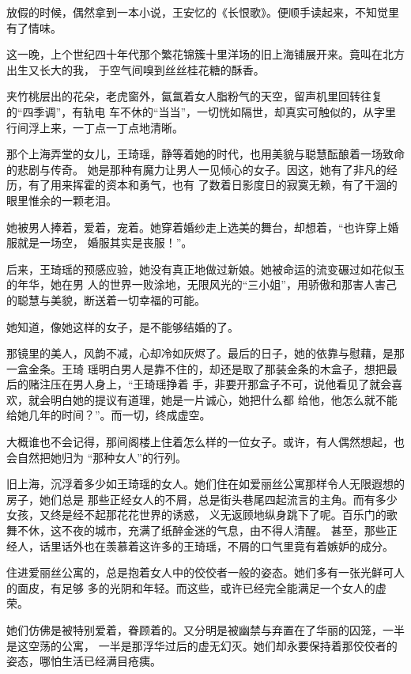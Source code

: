 	\endwriting



		放假的时候，偶然拿到一本小说，王安忆的《长恨歌》。便顺手读起来，不知觉里有了情味。

		这一晚，上个世纪四十年代那个繁花锦簇十里洋场的旧上海铺展开来。竟叫在北方出生又长大的我，
	于空气间嗅到丝丝桂花糖的酥香。

		夹竹桃层出的花朵，老虎窗外，氤氲着女人脂粉气的天空，留声机里回转往复的“四季调”，有轨电
	车不休的“当当”，一切恍如隔世，却真实可触似的，从字里行间浮上来，一丁点一丁点地清晰。

		那个上海弄堂的女儿，王琦瑶，静等着她的时代，也用美貌与聪慧酝酿着一场致命的悲剧与传奇。
	她是那种有魔力让男人一见倾心的女子。因这，她有了非凡的经历，有了用来挥霍的资本和勇气，也有
	了数着日影度日的寂寞无赖，有了干涸的眼里惟余的一颗老泪。

		她被男人捧着，爱着，宠着。她穿着婚纱走上选美的舞台，却想着，“也许穿上婚服就是一场空，
	婚服其实是丧服！”。

		后来，王琦瑶的预感应验，她没有真正地做过新娘。她被命运的流变碾过如花似玉的年华，她在男
	人的世界一败涂地，无限风光的“三小姐”，用骄傲和那害人害己的聪慧与美貌，断送着一切幸福的可能。

		她知道，像她这样的女子，是不能够结婚的了。

		那镜里的美人，风韵不减，心却冷如灰烬了。最后的日子，她的依靠与慰藉，是那一盒金条。王琦
	瑶明白男人是靠不住的，却还是取了那装金条的木盒子，想把最后的赌注压在男人身上，“王琦瑶挣着
	手，非要开那盒子不可，说他看见了就会喜欢，就会明白她的提议有道理，她是一片诚心，她把什么都
	给他，他怎么就不能给她几年的时间？”。而一切，终成虚空。

		大概谁也不会记得，那间阁楼上住着怎么样的一位女子。或许，有人偶然想起，也会自然把她归为
	“那种女人”的行列。

		旧上海，沉浮着多少如王琦瑶的女人。她们住在如爱丽丝公寓那样令人无限遐想的房子，她们总是
	那些正经女人的不屑，总是街头巷尾四起流言的主角。而有多少女孩，又终是经不起那花花世界的诱惑，
	义无返顾地纵身跳下了呢。百乐门的歌舞不休，这不夜的城市，充满了纸醉金迷的气息，由不得人清醒。
	甚至，那些正经人，话里话外也在羡慕着这许多的王琦瑶，不屑的口气里竟有着嫉妒的成分。

		住进爱丽丝公寓的，总是抱着女人中的佼佼者一般的姿态。她们多有一张光鲜可人的面皮，有足够
	多的光阴和年轻。而这些，或许已经完全能满足一个女人的虚荣。

		她们仿佛是被特别爱着，眷顾着的。又分明是被幽禁与弃置在了华丽的囚笼，一半是这空荡的公寓，
	一半是那浮华过后的虚无幻灭。她们却永要保持着那佼佼者的姿态，哪怕生活已经满目疮痍。

